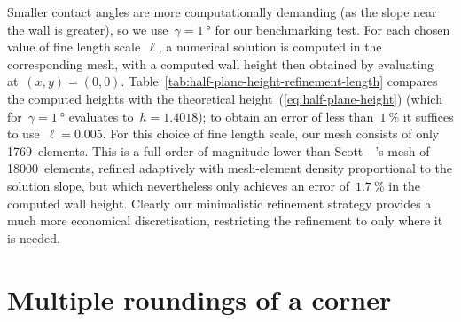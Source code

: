 Smaller contact angles are more computationally demanding
(as the slope near the wall is greater),
so we use~$\gamma = \SI{1}{\degree}$ for our benchmarking test.
For each chosen value of fine length scale~$\ell$,
a numerical solution is computed in the corresponding mesh,
with a computed wall height then obtained
by evaluating at~$(x, y) = (0, 0)$.
Table~\ref{tab:half-plane-height-refinement-length}
compares the computed heights
with the theoretical height~(\ref{eq:half-plane-height})
(which for~$\gamma = \SI{1}{\degree}$ evaluates to~$h = 1.4018$);
to obtain an error of less than~$\SI{1}{\percent}$
it suffices to use~$\ell = 0.005$.
For this choice of fine length scale,
our mesh consists of only 1769~elements.
This is a full order of magnitude lower than
Scott~\etal~\cite{scott-2005-computation-capillary-laplace-young}'s
mesh of 18000~elements, refined adaptively
with mesh-element density proportional to the solution slope,
but which nevertheless only achieves an error of~$\SI{1.7}{\percent}$
in the computed wall height.
Clearly our minimalistic refinement strategy
provides a much more economical discretisation,
restricting the refinement to only where it is needed.

\section{Multiple roundings of a corner}
\label{sec:moderate.multiple}
